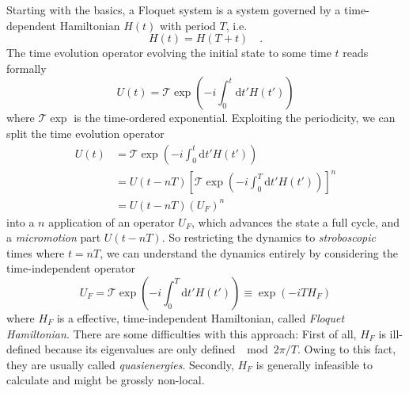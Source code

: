 Starting with the basics, a Floquet system is a system governed by a time-dependent Hamiltonian $H(t)$ with period $T$, i.e. 
\begin{equation}
	H(t) = H(T+t)\quad.
\end{equation}
The time evolution operator evolving the initial state to some time $t$ reads formally
\begin{equation}
	U(t) = \mathcal{T}\exp(-i\int_0^t\!\mathrm{d}t'H(t'))
\end{equation}
where $\mathcal{T}\exp$ is the time-ordered exponential.
Exploiting the periodicity, we can split the time evolution operator
\begin{align}
	U(t) &= \mathcal{T}\exp(-i\int_0^t\!\mathrm{d}t'H(t'))\\
	&= U(t-nT)\left[\mathcal{T}\exp(-i\int_0^T\!\mathrm{d}t'H(t'))\right]^n\\
	&= U(t-nT) (U_F)^n
\end{align}
into a $n$ application of an operator $U_F$, which advances the state a full cycle, and a \emph{micromotion} part $U(t-nT)$. So restricting the dynamics to \emph{stroboscopic} times where $t=nT$, we can understand the dynamics entirely by considering the time-independent operator
\begin{equation}
	U_F = \mathcal{T}\exp(-i\int_0^T\!\mathrm{d}t'H(t')) \equiv \exp(-iTH_F)
\end{equation}
where $H_F$ is a effective, time-independent Hamiltonian, called \emph{Floquet Hamiltonian}. There are some difficulties with this approach: First of all, $H_F$ is ill-defined because its eigenvalues are only defined $\mod 2\pi/T$. Owing to this fact, they are usually called \emph{quasienergies}. Secondly, $H_F$ is generally infeasible to calculate and might be grossly non-local.

